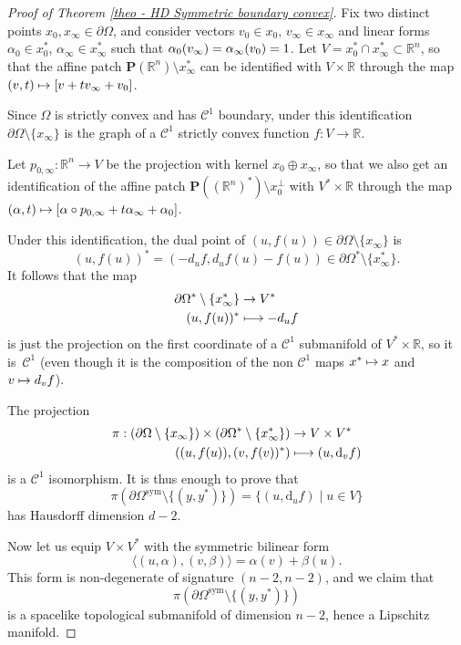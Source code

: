\documentclass[JEP,XML,SOM,Unicode,NoEqCountersInSection,NoFloatCountersInSection,published]{cedram}
\newcommand{\sym}{\mathrm{sym}}
\newcommand\mto{\mathchoice{\longmapsto}{\mapsto}{\mapsto}{\mapsto}}
\theoremstyle{definition}
\newcommand{\proj}{\mathbf{P}}
\newcommand{\R}{\mathbb{R}}
\begin{document}
\begin{proof}[Proof of Theorem \ref{theo - HD Symmetric boundary convex}]
Fix two distinct points $x_0,x_\infty\in \partial \Omega$, and consider vectors $v_0\!\in\!x_0$, $v_\infty\!\in\!x_\infty$ and linear forms $\alpha_0\!\in\!x_0^*$, $\alpha_\infty\!\in\!x_\infty^*$ such that $\alpha_0(v_\infty)=\alpha_\infty(v_0)=\nobreak1$. Let $V=x_0^*\cap x_\infty^*\subset \R^n$, so that the affine patch $\proj(\R^n)\setminus x_\infty^*$ can be identified with $V\times \R$ through the map $(v,t)\mto [v+tv_\infty+v_0]$.

Since $\Omega$ is strictly convex and has $\mathcal C^1$ boundary, under this identification $\partial\Omega\setminus \{x_\infty\}$ is the graph of a $\mathcal C^1$ strictly convex function $f:V\to \R$.

Let $p_{0,\infty}:\R^n\to V$ be the projection with kernel $x_0\oplus x_\infty$, so that we also get an identification of the affine patch $\proj\left((\R^n)^*\right)\setminus x_0^\perp$ with $V^*\times \R$ through the map $(\alpha,t)\mto [\alpha\circ p_{0,\infty} + t \alpha_\infty + \alpha_0]$.

Under this identification, the dual point of $(u,f(u))\in \partial \Omega\setminus \{x_\infty\}$ is
\[
(u,f(u))^*=(-d_uf,d_uf(u)-f(u))\in \partial\Omega^*\setminus \{x_\infty^*\}.
\]
It follows that the map
\begin{align*}
\partial\Omega^*\setminus \{x_\infty^*\} & \to V^* \\
(u,f(u))^* & \mto -d_uf
\end{align*}
is just the projection on the first coordinate of a $\mathcal C^1$ submanifold of $V^*\times \R$, so it is~$\mathcal C^1$ (even though it is the composition of the non $\mathcal C^1$ maps $x^*\mto x$ and $v\mto d_vf$).

The projection
\begin{align*}
\pi: \left(\partial \Omega \setminus \{x_\infty\}\right)\times \left(\partial \Omega^*\setminus \{x_\infty^*\}\right) & \to V\times V^*\\
\left((u, f(u)), (v,f(v))^*\right) & \mto (u, \mathrm d_v f)
\end{align*}
is a $\mathcal C^1$ isomorphism. It is thus enough to prove that
\[\pi(\partial \Omega^{\sym} \setminus \{(y,y^*)\}) = \{(u, \mathrm d_u f)\mid u\in V\}\]
has Hausdorff dimension $d-2$.

Now let us equip $V \times V^*$ with the symmetric bilinear form
\[\langle (u,\alpha), (v,\beta)\rangle = \alpha(v) + \beta(u).\]
This form is non-degenerate of signature $(n-2,n-2)$, and we claim that
\[
\pi(\partial \Omega^{\sym} \setminus \{(y,y^*)\})
\]
is a spacelike topological submanifold of dimension $n-2$, hence a Lipschitz manifold.


\end{proof}
\end{document}
